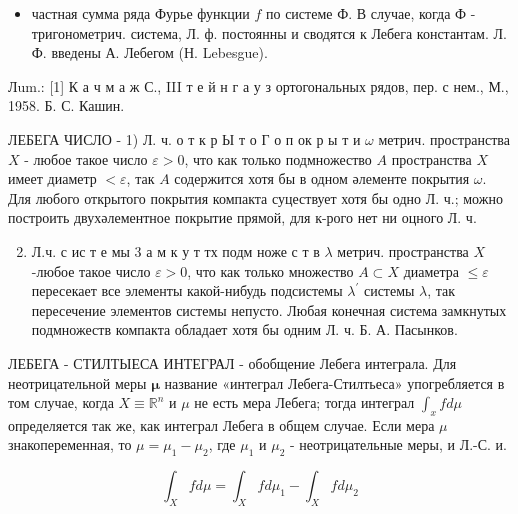 \documentclass[10pt]{article}
\begin{document}
\begin{itemize}

  \item частная сумма ряда Фурье функции $f$ по системе Ф. В случае, когда Ф - тригонометрич. система, Л. ф. постоянны и сводятся к Лебега константам. Л. Ф. введены А. Лебегом (Н. Lebesgue).

\end{itemize}



Лum.: [1] К а ч м а ж С., III т е й н г а у з ортогональных рядов, пер. с нем., М., 1958. Б. С. Кашин.



ЛЕБЕГА ЧИСЛО - 1) Л. ч. о т к р Ы т о Г о п ок р ы т и $\omega$ метрич. пространства $X$ - любое такое число $\varepsilon>0$, что как только подмножество $A$ пространства $X$ имеет диаметр $<\varepsilon$, так $A$ содержится хотя бы в одном әлементе покрытия $\omega$. Для любого открытого покрытия компакта суцествует хотя бы одно Л. ч.; можно построить двухәлементное покрытие прямой, для к-рого нет ни оцного Л. ч.



\begin{enumerate}

  \setcounter{enumi}{1}

  \item Л.ч. с ис т е мы 3 а м к у т тх подм ноже с т в $\lambda$ метрич. пространства $X$-любое такое число $\varepsilon>0$, что как только множество $A \subset X$ диаметра $\leqslant \varepsilon$ пересекает все элементы какой-нибудь подсистемы $\lambda^{\prime}$ системы $\lambda$, так пересечение элементов системы непусто. Любая конечная система замкнутых подмножеств компакта обладает хотя бы одним Л. ч. Б. А. Пасынков.

\end{enumerate}



ЛЕБЕГА - СТИЛТЫЕСА ИНТЕГРАЛ - обобщение Лебега интеграла. Для неотрицательной меры $\boldsymbol{\mu}$ название «интеграл Лебега-Стилтьеса» упогребляется в том случае, когда $X \equiv \mathbb{R}^{n}$ и $\mu$ не есть мера Лебега; тогда интеграл $\int_{x} f d \mu$ определяется так же, как интеграл Лебега в общем случае. Если мера $\mu$ знакопеременная, то $\mu=\mu_{1}-\mu_{2}$, где $\mu_{1}$ и $\mu_{2}$ - неотрицательные меры, и Л.-С. и.



\[

\int_{X} f d \mu=\int_{X} f d \mu_{1}-\int_{X} f d \mu_{2}

\]
\end{document}
